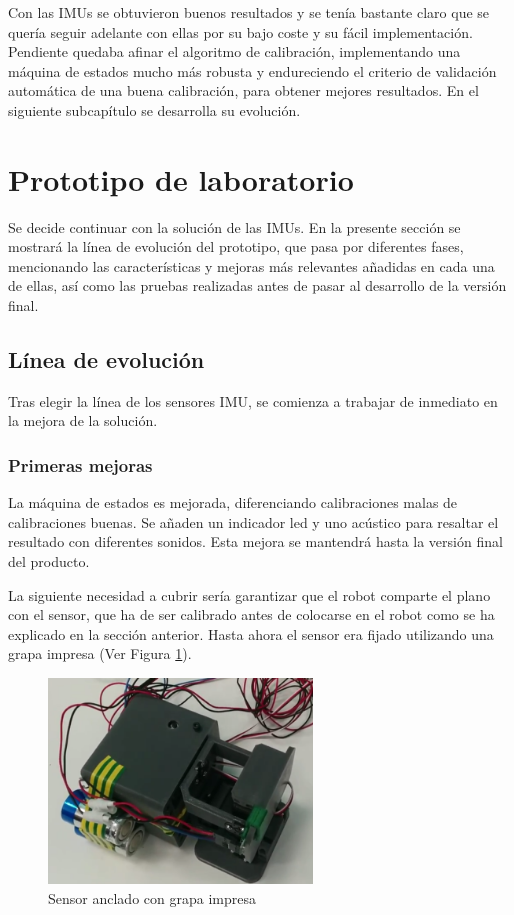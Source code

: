 Con las IMUs se obtuvieron buenos resultados y se tenía bastante claro que se quería seguir adelante con ellas por su bajo coste y su fácil implementación. Pendiente quedaba afinar el algoritmo de calibración, implementando una máquina de estados mucho más robusta y endureciendo el criterio de validación automática de una buena calibración, para obtener mejores resultados. En el siguiente subcapítulo se desarrolla su evolución.


\section{Prototipo de laboratorio}

Se decide continuar con la solución de las IMUs. En la presente sección se mostrará la línea de evolución del prototipo, que pasa por diferentes fases, mencionando las características y mejoras más relevantes añadidas en cada una de ellas, así como las pruebas realizadas antes de pasar al desarrollo de la versión final.

\subsection{Línea de evolución}

Tras elegir la línea de los sensores IMU, se comienza a trabajar de inmediato en la mejora de la solución.

\subsubsection{Primeras mejoras}

La máquina de estados es mejorada, diferenciando calibraciones malas de calibraciones buenas. Se añaden un indicador led y uno acústico para resaltar el resultado con diferentes sonidos. Esta mejora se mantendrá hasta la versión final del producto.

La siguiente necesidad a cubrir sería garantizar que el robot comparte el plano con el sensor, que ha de ser calibrado antes de colocarse en el robot como se ha explicado en la sección anterior. Hasta ahora el sensor era fijado utilizando una grapa impresa (Ver Figura \ref{fig:grapa}).

\begin{figure}[h]
\centering
\includegraphics[width=70mm]{Figures/grapa}
\caption[Sensor anclado con grapa impresa]{Sensor anclado con grapa impresa}
\label{fig:grapa}
\end{figure}

